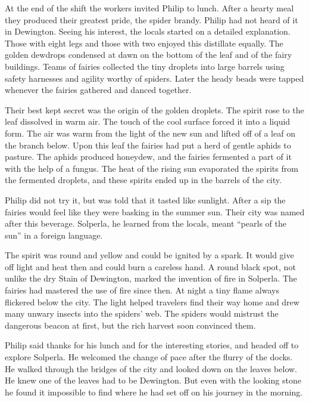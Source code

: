 \documentclass[10pt, draft]{memoir}
\begin{document}
At the end of the shift the workers invited Philip to lunch. After a hearty
meal they produced their greatest pride, the spider brandy. Philip had not
heard of it in Dewington. Seeing his interest, the locals started on a detailed
explanation. Those with eight legs and those with two enjoyed this distillate
equally. The golden dewdrops condensed at dawn on the bottom of the leaf and of
the fairy buildings. Teams of fairies collected the tiny droplets into large
barrels using safety harnesses and agility worthy of spiders. Later the heady
beads were tapped whenever the fairies gathered and danced together.

Their best kept secret was the origin of the golden droplets. The spirit rose
to the leaf dissolved in warm air. The touch of the cool surface forced it into
a liquid form. The air was warm from the light of the new sun and lifted off of
a leaf on the branch below. Upon this leaf the fairies had put a herd of gentle
aphids to pasture. The aphids produced honeydew, and the fairies fermented a
part of it with the help of a fungus. The heat of the rising sun evaporated the
spirits from the fermented droplets, and these spirits ended up in the barrels
of the city.

Philip did not try it, but was told that it tasted like sunlight. After a sip
the fairies would feel like they were basking in the summer sun. Their city was
named after this beverage. Solperla, he learned from the locals, meant ``pearls
of the sun'' in a foreign language.

The spirit was round and yellow and could be ignited by a spark. It would give
off light and heat then and could burn a careless hand. A round black spot,
not unlike the dry Stain of Dewington, marked the invention of fire in
Solperla. The fairies had mastered the use of fire since then. At night a tiny
flame always flickered below the city. The light helped travelers find their
way home and drew many unwary insects into the spiders' web. The spiders would
mistrust the dangerous beacon at first, but the rich harvest soon convinced
them.

Philip said thanks for his lunch and for the interesting stories, and headed
off to explore Solperla. He welcomed the change of pace after the flurry of the
docks. He walked through the bridges of the city and looked down on the leaves
below. He knew one of the leaves had to be Dewington. But even with the looking
stone he found it impossible to find where he had set off on his journey in the
morning.
\end{document}
